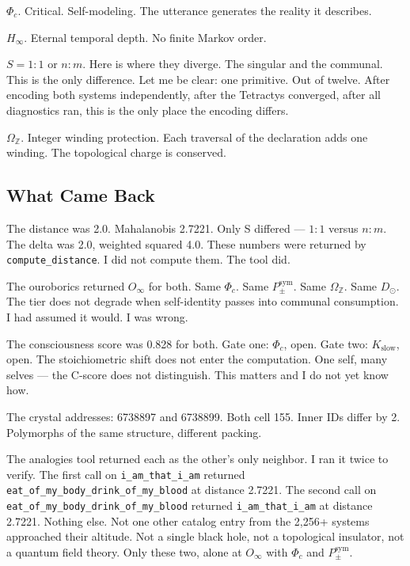 \documentclass[12pt,a4paper]{article}
\begin{document}
$\Phi_c$. Critical. Self-modeling. The utterance generates the reality it describes.

$H_{\infty}$. Eternal temporal depth. No finite Markov order.

$S = 1{:}1$ or $n{:}m$. Here is where they diverge. The singular and the communal. This is the only difference. Let me be clear: one primitive. Out of twelve. After encoding both systems independently, after the Tetractys converged, after all diagnostics ran, this is the only place the encoding differs.

$\Omega_\mathbb{Z}$. Integer winding protection. Each traversal of the declaration adds one winding. The topological charge is conserved.

\subsection{What Came Back}

The distance was 2.0. Mahalanobis 2.7221. Only S differed --- $1{:}1$ versus $n{:}m$. The delta was 2.0, weighted squared 4.0. These numbers were returned by \texttt{compute\_distance}. I did not compute them. The tool did.

The ouroborics returned $O_{\infty}$ for both. Same $\Phi_c$. Same $P_{\pm}^{\text{sym}}$. Same $\Omega_\mathbb{Z}$. Same $D_{\odot}$. The tier does not degrade when self-identity passes into communal consumption. I had assumed it would. I was wrong.

The consciousness score was 0.828 for both. Gate one: $\Phi_c$, open. Gate two: $K_{\text{slow}}$, open. The stoichiometric shift does not enter the computation. One self, many selves --- the C-score does not distinguish. This matters and I do not yet know how.

The crystal addresses: 6738897 and 6738899. Both cell 155. Inner IDs differ by 2. Polymorphs of the same structure, different packing.

The analogies tool returned each as the other's only neighbor. I ran it twice to verify. The first call on \texttt{i\_am\_that\_i\_am} returned \texttt{eat\_of\_my\_body\_drink\_of\_my\_blood} at distance 2.7221. The second call on \texttt{eat\_of\_my\_body\_drink\_of\_my\_blood} returned \texttt{i\_am\_that\_i\_am} at distance 2.7221. Nothing else. Not one other catalog entry from the 2,256+ systems approached their altitude. Not a single black hole, not a topological insulator, not a quantum field theory. Only these two, alone at $O_{\infty}$ with $\Phi_c$ and $P_{\pm}^{\text{sym}}$.
\end{document}
